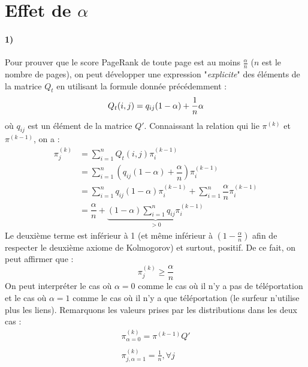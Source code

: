 \documentclass[a4paper,titlepage]{report}
\begin{document}
\section{Effet de $\alpha$}
\label{sec:effet_alpha}
\paragraph{1)}
Pour prouver que le score PageRank de toute page est au moins $\frac{\alpha}{n}$ ($n$ est le nombre de pages), on peut développer une expression "\textit{explicite}" des éléments de la matrice $Q_t$ en utilisant la formule donnée précédemment : 
\[
Q_t(i,j) = q_{ij} (1 - \alpha) + \dfrac{1}{n}\alpha\\
\]
où $q_{ij}$ est un élément de la matrice $Q'$. Connaissant la relation qui lie $\pi^{(k)}$ et $\pi^{(k-1)}$, on a :
\[
\begin{aligned}
\pi^{(k)}_j &= \sum\limits_{i = 1}^n Q_t(i,j)\pi^{(k-1)}_i\\
 &= \sum\limits_{i = 1}^n \left(q_{ij} (1 - \alpha) + \dfrac{\alpha}{n}\right)\pi^{(k-1)}_i\\
 &= \sum\limits_{i = 1}^n q_{ij} (1 - \alpha) \pi^{(k-1)}_i + \sum\limits_{i = 1}^n \dfrac{\alpha}{n} \pi^{(k-1)}_i\\
 &= \dfrac{\alpha}{n} + \underbrace{(1 - \alpha) \sum\limits_{i = 1}^n q_{ij} \pi^{(k-1)}_i}_{> 0}
\end{aligned}
\]
Le deuxième terme est inférieur à 1 (et même inférieur à $(1 - \frac{\alpha}{n})$ afin de respecter le deuxième axiome de Kolmogorov) et surtout, positif. De ce fait, on peut affirmer que :
\[
\pi^{(k)}_j \geq \dfrac{\alpha}{n}
\]
On peut interpréter le cas où $\alpha = 0$ comme le cas où il n'y a pas de téléportation et le cas où $\alpha = 1$ comme le cas où il n'y a que téléportation (le surfeur n'utilise plus les liens). Remarquons les valeurs prises par les distributions dans les deux cas :
\[
\begin{array}{l}
\pi_{\alpha = 0}^{(k)} = \pi^{(k-1)} Q'\\ \\
\pi_{j,\alpha = 1}^{(k)} = \frac{1}{n}, \forall j
\end{array}
\]
\end{document}
